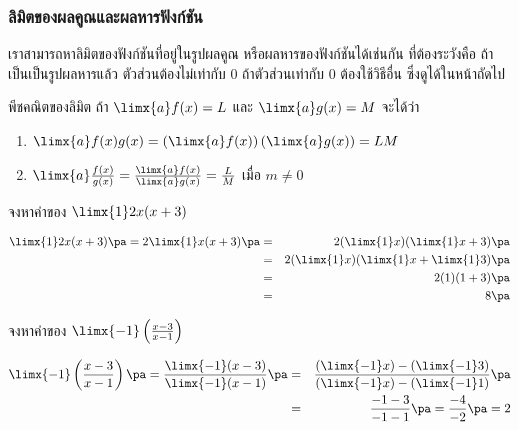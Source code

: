 \begin{frame}
\frametitle{ลิมิตของผลคูณและผลหารฟังก์ชัน}
เราสามารถหาลิมิตของฟังก์ชันที่อยู่ในรูปผลคูณ หรือผลหารของฟังก์ชันได้เช่นกัน ที่ต้องระวังคือ ถ้าเป็นเป็นรูปผลหารแล้ว ตัวส่วนต้องไม่เท่ากับ 0 ถ้าตัวส่วนเท่ากับ 0 ต้องใช้วิธีอื่น ซึ่งดูได้ในหน้าถัดไป
\begin{prop}{พีชคณิตของลิมิต}{}
ถ้า $\limx{a} f(x) = L$ และ $\limx{a} g(x) = M$ จะได้ว่า \pa
\begin{enumerate}
\item $\limx{a} f(x) g(x) = \left(\limx{a} f(x)\right)\left( \limx{a} g(x)\right) = LM$ \pa
\item $\limx{a} \frac{f(x)}{g(x)} = \frac{ \limx{a} f(x)}{ \limx{a} g(x)} = \frac{L}{M}$ เมื่อ $m \neq 0$ \pa
\end{enumerate}
\end{prop}
\end{frame}


\begin{frame}[t]
\begin{ex}
จงหาค่าของ  $\limx{1} 2x(x+3)$
\end{ex}
\begin{sol}
\begin{eqnarray*}
\limx{1} 2x(x+3) \pa = 2 \limx{1} x(x+3) \pa &=& 2 (\limx{1} x)(\limx{1} x+3) \pa \\
&=& 2(\limx{1} x)(\limx{1} x + \limx{1} 3) \pa \\
&=& 2(1)(1+3) \pa\\
&=& 8 \pa \\
\end{eqnarray*}
\end{sol}
\end{frame}

\begin{frame}[t]
\begin{ex}
จงหาค่าของ $\limx{-1} \left(\frac{x-3}{x-1}\right) $
\end{ex}
\begin{sol}
\begin{eqnarray*}
\limx{-1} \left(\frac{x-3}{x-1}\right) \pa = \frac{\limx{-1} (x-3)}{\limx{-1} (x-1)} \pa &=& \frac{\left(\limx{-1} x\right) - \left(\limx{-1}3\right)}{\left(\limx{-1} x\right) - \left(\limx{-1} 1\right)} \pa \\
&=& \frac{-1-3}{-1-1} \pa = \frac{-4}{-2} \pa = 2
\end{eqnarray*}
\end{sol}
\end{frame}

